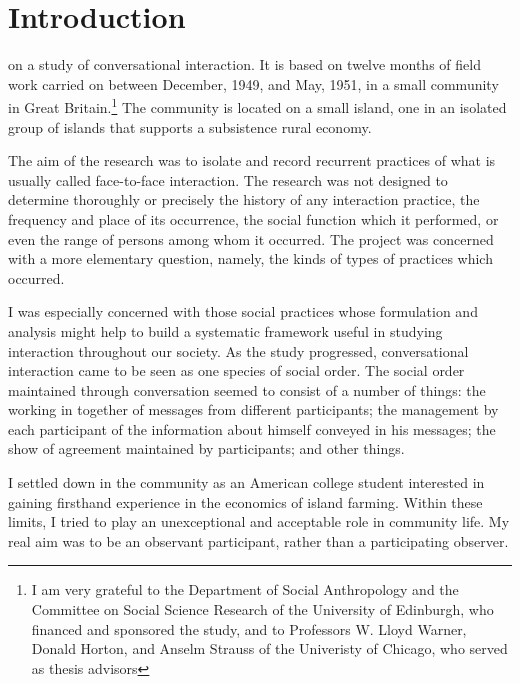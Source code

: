 \documentclass[openany,nobib]{tufte-book}
\let\oldchapter\chapter
\def\chapter{%
  \setcounter{footnote}{0}%
  \oldchapter
}
\begin{document}


\chapter[INTRODUCTION]{Introduction}
\label{ch:Introduction}

on a study of conversational interaction. It is based
on twelve months of field work carried on between December, 1949, and
May, 1951, in a small community in Great Britain.\footnote{I am very
  grateful to the Department of Social Anthropology and the Committee on
  Social Science Research of the University of Edinburgh, who financed
  and sponsored the study, and to Professors W. Lloyd Warner, Donald
  Horton, and Anselm Strauss of the Univeristy of Chicago, who served as
  thesis advisors} The community is located on a small island, one in an
isolated group of islands that supports a subsistence rural economy.

The aim of the research was to isolate and record recurrent practices of
what is usually called face-to-face interaction. The research was not
designed to determine thoroughly or precisely the history of any
interaction practice, the frequency and place of its occurrence, the
social function which it performed, or even the range of persons among
whom it occurred. The project was concerned with a more elementary
question, namely, the kinds of types of practices which occurred.

I was especially concerned with those social practices whose formulation
and analysis might help to build a systematic framework useful in
studying interaction throughout our society. As the study progressed,
conversational interaction came to be seen as one species of social
order. The social order maintained through conversation seemed to
consist of a number of things: the working in together of messages from
different participants; the management by each participant of the
information about himself conveyed in his messages; the show of
agreement maintained by participants; and other things.

I settled down in the community as an American college student
interested in gaining firsthand experience in the economics of island
farming. Within these limits, I tried to play an unexceptional and
acceptable role in community life. My real aim was to be an observant
participant, rather than a participating observer.
\end{document}
